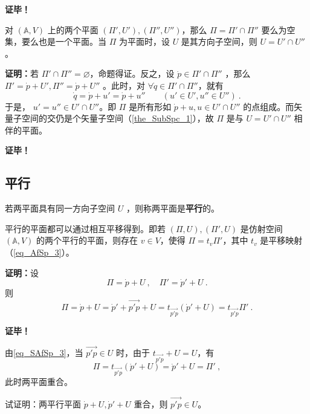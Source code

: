 \textbf{证毕！}
\begin{corollary}{}
对 $(\mathbb A,V)$ 上的两个平面 $(\Pi',U'),(\Pi'',U'')$，那么 $\Pi=\Pi'\cap\Pi''$ 要么为空集，要么也是一个平面。当 $\Pi$ 为平面时，设 $U$ 是其方向子空间，则 $U=U'\cap U''$。
\end{corollary}
\textbf{证明：}若 $\Pi'\cap\Pi''=\varnothing$，命题得证。反之，设 $\dot p\in \Pi'\cap\Pi''$ ，那么 $\Pi'=\dot p+U',\Pi''=\dot p+U''$ 。此时，对 $\forall\dot q\in\Pi'\cap\Pi''$，就有 \begin{equation}
\dot q=\dot p+u'=\dot p+u''\qquad (u'\in U',u''\in U'')~.
\end{equation}
于是， $u'=u''\in U'\cap U''$。即 $\Pi$ 是所有形如 $\dot p+u,u\in U'\cap U''$ 的点组成。而矢量子空间的交仍是个矢量子空间（\autoref{the_SubSpc_1}），故 $\Pi$ 是与 $U=U'\cap U''$ 相伴的平面。

\textbf{证毕！}
\subsection{平行}

\begin{definition}{}
若两平面具有同一方向子空间 $U$ ，则称两平面是\textbf{平行}的。
\end{definition}
\begin{theorem}{}
平行的平面都可以通过相互平移得到。即若 $(\Pi,U),(\Pi',U)$ 是仿射空间 $(\mathbb A,V)$ 的两个平行的平面，则存在 $v\in V$，使得 $\Pi=t_{v}\Pi'$，其中 $t_v$ 是平移映射（\autoref{eq_AfSp_3}）。
\end{theorem}
\textbf{证明：}设
\begin{equation}
\Pi=\dot p+U~,\quad \Pi'=\dot p'+U~.
\end{equation}
则
\begin{equation}\label{eq_SAfSp_3}
\Pi=\dot p+U=\dot p'+\overrightarrow{p'p}+U=t_{\overrightarrow{p'p}}(\dot p'+U)=t_{\overrightarrow{p'p}} \Pi'~.
\end{equation}

\textbf{证毕！}

由\autoref{eq_SAfSp_3}，当 $\overrightarrow{p'p}\in U$ 时，由于 $t_{\overrightarrow{p'p}}+U=U$，有
\begin{equation}
\Pi=t_{\overrightarrow{p'p}}(\dot p'+U)=\dot p'+U=\Pi'~,
\end{equation}
此时两平面重合。
\begin{exercise}{}
试证明：两平行平面 $\dot p+U,\dot p'+U$ 重合，则 $\overrightarrow{p'p}\in U$。
\end{exercise}
